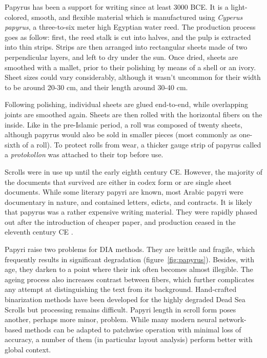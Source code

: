 Papyrus has been a support for writing since at least 3000 BCE. It is a
light-colored, smooth, and flexible material which is manufactured using
\emph{Cyperus papyrus}, a three-to-six meter high Egyptian water reed. The
production process goes as follow: first, the reed stalk is cut into halves,
and the pulp is extracted into thin strips. Strips are then arranged into
rectangular sheets made of two perpendicular layers, and left to dry under the
sun.  Once dried, sheets are smoothed with a mallet, prior to their polishing
by means of a shell or an ivory. Sheet sizes could vary considerably, although
it wasn’t uncommon for their width to be around 20-30 cm, and their length
around 30-40 cm.

Following polishing, individual sheets are glued end-to-end, while overlapping
joints are smoothed again. Sheets are then rolled with the horizontal fibers on
the inside. Like in the pre-Islamic period, a roll was composed of twenty
sheets, although papyrus would also be sold in smaller pieces (most commonly as
one-sixth of a roll). To protect rolls from wear, a thicker gauge strip of
papyrus called a \emph{protokollon} was attached to their top before use.

Scrolls were in use up until the early eighth century CE. However, the majority
of the documents that survived are either in codex form or are single sheet
documents\cite[pg.30]{deroche2006islamic}. While some literary papyri are
known, most Arabic papyri were documentary in nature, and contained letters,
edicts, and contracts. It is likely that papyrus was a rather expensive writing
material. They were rapidly phased out after the introduction of cheaper paper,
and production ceased in the eleventh century CE
\cite[pg.193-194]{gacek2009arabic}. 

Papyri raise two problems for DIA methods. They are brittle and fragile, which
frequently results in significant degradation (figure~\ref{fig:papyrus}).
Besides, with age, they darken to a point where their ink often becomes almost
illegible. The ageing process also increases contrast between fibers, which
further complicates any attempt at distinguishing the text from its background.
Hand-crafted binarization methods have been developed for the highly degraded
Dead Sea Scrolls \cite{dhali2017digital, lavee2013computer} but processing
remains difficult. Papyri length in scroll form poses another, perhaps more
minor, problem.  While many modern neural network-based methods can be adapted
to patchwise operation with minimal loss of accuracy, a number of them (in
particular layout analysis) perform better with global context. 

